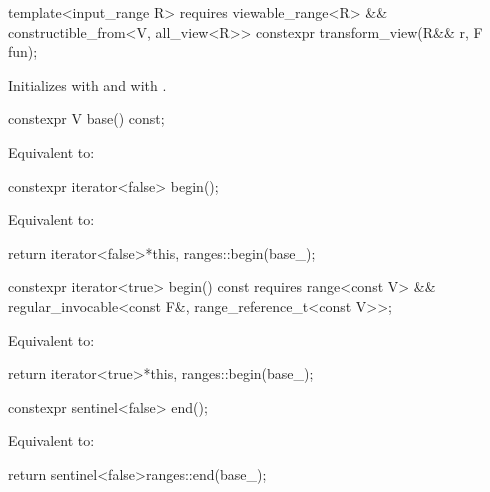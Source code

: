 %
\begin{itemdecl}
template<input_range R>
  requires viewable_range<R> && constructible_from<V, all_view<R>>
constexpr transform_view(R&& r, F fun);
\end{itemdecl}

\begin{itemdescr}
\pnum
\effects
Initializes  with 
and  with .
\end{itemdescr}

%
\begin{itemdecl}
constexpr V base() const;
\end{itemdecl}

\begin{itemdescr}
\pnum
\effects
Equivalent to: 
\end{itemdescr}

%
\begin{itemdecl}
constexpr iterator<false> begin();
\end{itemdecl}

\begin{itemdescr}
\pnum
\effects
Equivalent to:
\begin{codeblock}
return iterator<false>{*this, ranges::begin(base_)};
\end{codeblock}
\end{itemdescr}

%
\begin{itemdecl}
constexpr iterator<true> begin() const
  requires range<const V> &&
           regular_invocable<const F&, range_reference_t<const V>>;
\end{itemdecl}

\begin{itemdescr}
\pnum
\effects
Equivalent to:
\begin{codeblock}
return iterator<true>{*this, ranges::begin(base_)};
\end{codeblock}
\end{itemdescr}

%
\begin{itemdecl}
constexpr sentinel<false> end();
\end{itemdecl}

\begin{itemdescr}
\pnum
\effects
Equivalent to:
\begin{codeblock}
return sentinel<false>{ranges::end(base_)};
\end{codeblock}
\end{itemdescr}

